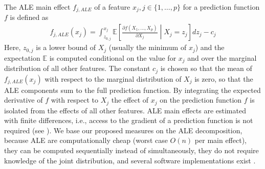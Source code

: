 \documentclass[runningheads]{llncs}\usepackage[]{graphicx}\usepackage[]{color}
\newcommand{\falej}{f_{j,ALE}}                                        %
\begin{document}
The ALE main effect $f_{j,ALE}$ of a feature $x_j, j \in \{1,\ldots,p\}$ for a prediction function $f$ is defined as
\begin{eqnarray}\label{eqn:ale}
\falej(x_j) = \int_{z_{0,j}}^{x_j} \mathbb{E}\left[\frac{\partial f(X_1,\ldots,X_p)}{\partial X_j}\middle|X_j = z_j\right]dz_j-c_j
\end{eqnarray}
Here, $z_{0,j}$ is a lower bound of $X_j$ (usually the minimum of $x_j$) and the expectation $\mathbb{E}$ is computed conditional on the value for $x_j$ and over the marginal distribution of all other features.
The constant $c_j$ is chosen so that the mean of $f_{j,ALE}(x_j)$ with respect to the marginal distribution of $X_j$ is zero, so that the ALE components sum to the full prediction function.
By integrating the expected derivative of $f$ with respect to $X_j$ the effect of $x_j$ on the prediction function $f$ is isolated from the effects of all other features.
ALE main effects are estimated with finite differences, i.e., access to the gradient of a prediction function is not required (see \citep{apley2016visualizing}).
We base our proposed measures on the ALE decomposition, because ALE are computationally cheap (worst case $O(n)$ per main effect), they can be computed sequentially instead of simultaneously, they do not require knowledge of the joint distribution, and several software implementations exist \citep{iml,alepackage}.
\end{document}
